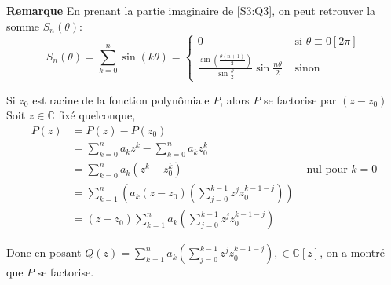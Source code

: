 \documentclass{article}
\renewenvironment{question_kholle}[2][ ]
{
	\subsection{\texorpdfstring{#2}{}}
	\notblank{#1}
	{
		\noindent #1
		\bigbreak
	}
	{}
	\begin{proof}
}
{
	\end{proof}
}
\begin{document}
\textbf{Remarque}
En prenant la partie imaginaire de \eqref{S3:Q3}, on peut retrouver la somme $S_n(\theta)$:
$$
	S_{n}(\theta)= \sum_{k=0}^n \sin(k \theta) = \left\{ \begin{array}{ll}
		0                                                                                             & \text{ si } \theta \equiv 0 [2 \pi] \\
		\frac{\sin\left( \frac{\theta(n+1)}{2} \right)}{\sin \frac{\theta}{2}} \sin \frac{n\theta}{2} & \text{ sinon}
	\end{array}\right.
$$
\begin{question_kholle}
	[{Soient $n \in \mathbb{N}, (a_{0}, \dots, a_{n})\in\mathbb{C}^{n+1}$ et $z_{0} \in \mathbb{C}$ Posons pour tout $z \in \mathbb{C}, P(z) = \sum_{k=0}^{n}a_{k}z^{k}$
	\begin{propositions}
		\item Si $P(z_{0}) = 0$, alors $\exists Q \in\mathbb{C}[z]:\forall z \in \mathbb{C}, P(z)=(z-z_{0})Q(z)$
	\end{propositions}
	}]
	{Si $z_0$ est racine de la fonction polynômiale $P$, alors $P$ se factorise par $(z-z_0)$}
	Soit $z \in \mathbb{C}$ fixé quelconque,
	\begin{align*}
		P(z) & = P(z) - P(z_{0})                                                                                                        \\
		     & = \sum_{k=0}^{n}a_{k}z^{k} - \sum_{k=0}^{n}a_{k}z_{0}^{k}                                                                \\
		     & = \sum_{k=0}^{n}a_{k}(z^{k}-z_{0}^{k})                                                          & \text{ nul pour }k = 0 \\
		     & = \sum_{k=1}^{n}\left( a_{k}(z-z_{0})\left( \sum _{j=0}^{k-1}z^{j}z_{0}^{k-1-j} \right) \right)                          \\
		     & = (z-z_{0}) \sum_{k=1}^{n}a_{k}\left( \sum _{j=0}^{k-1}z^{j}z_{0}^{k-1-j} \right)
	\end{align*}

	Donc en posant $Q(z) = \sum_{k=1}^{n}a_{k}\left( \sum _{j=0}^{k-1}z^{j}z_{0}^{k-1-j} \right), \in \mathbb{C}[z]$, on a montré que $P$ se factorise.
\end{question_kholle}
\end{document}
